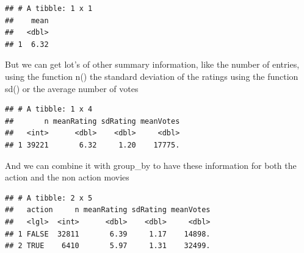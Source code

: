 \documentclass[]{book}
\newenvironment{Shaded}{\begin{snugshade}}{\end{snugshade}}
\newcommand{\DataTypeTok}[1]{\textcolor[rgb]{0.13,0.29,0.53}{#1}}
\newcommand{\KeywordTok}[1]{\textcolor[rgb]{0.13,0.29,0.53}{\textbf{#1}}}
\newcommand{\NormalTok}[1]{#1}
\newcommand{\OperatorTok}[1]{\textcolor[rgb]{0.81,0.36,0.00}{\textbf{#1}}}
\newcommand{\StringTok}[1]{\textcolor[rgb]{0.31,0.60,0.02}{#1}}
\begin{document}
\begin{verbatim}
## # A tibble: 1 x 1
##    mean
##   <dbl>
## 1  6.32
\end{verbatim}

But we can get lot's of other summary information, like the number of entries, using the function n() the standard deviation of the ratings using the function sd() or the average number of votes

\begin{Shaded}
\end{Shaded}

\begin{verbatim}
## # A tibble: 1 x 4
##       n meanRating sdRating meanVotes
##   <int>      <dbl>    <dbl>     <dbl>
## 1 39221       6.32     1.20    17775.
\end{verbatim}

And we can combine it with group\_by to have these information for both the action and the non action movies

\begin{Shaded}
\end{Shaded}

\begin{verbatim}
## # A tibble: 2 x 5
##   action     n meanRating sdRating meanVotes
##   <lgl>  <int>      <dbl>    <dbl>     <dbl>
## 1 FALSE  32811       6.39     1.17    14898.
## 2 TRUE    6410       5.97     1.31    32499.
\end{verbatim}
\end{document}
